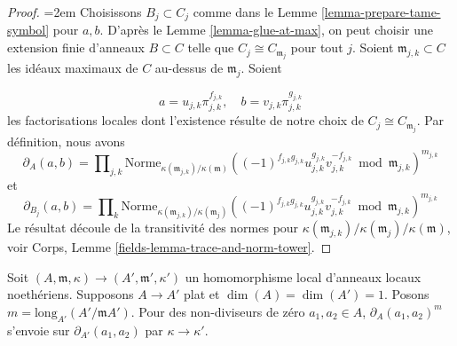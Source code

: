 \begin{proof}
{\emergencystretch=2em Choisissons $B_j \subset C_j$ comme dans le
Lemme \ref{lemma-prepare-tame-symbol} pour $a, b$.
D'après le Lemme \ref{lemma-glue-at-max}, on peut choisir une extension finie
d'anneaux $B \subset C$ telle que $C_j \cong C_{\mathfrak m_j}$ pour tout $j$.
Soient $\mathfrak m_{j, k} \subset C$ les idéaux maximaux de $C$
au-dessus de $\mathfrak m_j$. Soient\par}
$$
a = u_{j, k}\pi_{j, k}^{f_{j, k}},\quad
b = v_{j, k}\pi_{j, k}^{g_{j, k}}
$$
les factorisations locales dont l'existence résulte de notre choix de
$C_j \cong C_{\mathfrak m_j}$. Par définition, nous avons
$$
\partial_A(a, b) = 
\prod\nolimits_{j, k}
\text{Norme}_{\kappa(\mathfrak m_{j, k})/\kappa(\mathfrak m)}
((-1)^{f_{j, k}g_{j, k}}u_{j, k}^{g_{j, k}}v_{j, k}^{-f_{j, k}}
\bmod \mathfrak m_{j, k})^{m_{j, k}}
$$
et
$$
\partial_{B_j}(a, b) = 
\prod\nolimits_k
\text{Norme}_{\kappa(\mathfrak m_{j, k})/\kappa(\mathfrak m_j)}
((-1)^{f_{j, k}g_{j, k}}u_{j, k}^{g_{j, k}}v_{j, k}^{-f_{j, k}}
\bmod \mathfrak m_{j, k})^{m_{j, k}}
$$
Le résultat découle de la transitivité des normes
pour $\kappa(\mathfrak m_{j, k})/\kappa(\mathfrak m_j)/\kappa(\mathfrak m)$, voir
Corps, Lemme \ref{fields-lemma-trace-and-norm-tower}.
\end{proof}

\begin{lemma}
\label{lemma-tame-symbol-formally-smooth}
Soit $(A, \mathfrak m, \kappa) \to (A', \mathfrak m', \kappa')$
un homomorphisme local d'anneaux locaux noethériens. Supposons $A \to A'$
plat et $\dim(A) = \dim(A') = 1$. Posons
$m = \text{long}_{A'}(A'/\mathfrak mA')$.
Pour des non-diviseurs de zéro $a_1, a_2 \in A$,
$\partial_A(a_1, a_2)^m$ s'envoie sur $\partial_{A'}(a_1, a_2)$
par $\kappa \to \kappa'$.
\end{lemma}


